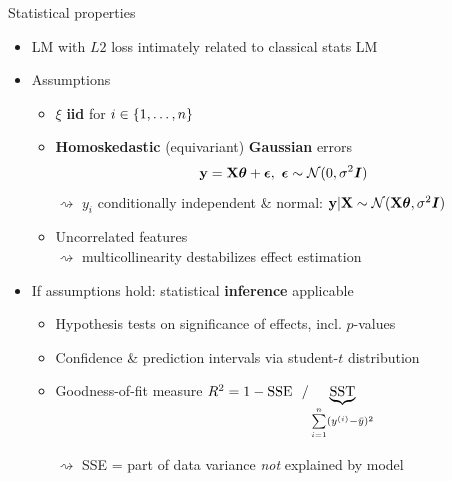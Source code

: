 \documentclass[11pt,compress,t,notes=noshow, xcolor=table]{beamer}
\begin{document}

\begin{vbframe}{Statistical properties}

\begin{itemize}
    \item LM with $L2$ loss intimately related to classical stats LM
    \item Assumptions
    \begin{itemize}
        \item $\xi$ \textbf{iid} for $i \in \{1, \ldots, n\}$
        \item \textbf{Homoskedastic} (equivariant) 
         \textbf{Gaussian} errors
        $$\mathbf{y} = \mathbf{X} \bm{\theta} + \bm{\epsilon}, ~ \bm{\epsilon} \sim 
        \mathcal{N}(0, \sigma^2 \boldsymbol{I})  $$
        $\rightsquigarrow$ $y_i$ conditionally independent \& normal:
        $\mathbf{y} | \mathbf{X} \sim \mathcal{N}(\mathbf{X} \bm{\theta}, \sigma^2 \boldsymbol{I})$
        \item Uncorrelated features \\$\rightsquigarrow$ 
        multicollinearity destabilizes effect estimation 
    \end{itemize}
    \item If assumptions hold: statistical \textbf{inference} applicable
    \begin{itemize}
            \item Hypothesis tests on significance of effects, incl. $p$-values
            \item Confidence \& prediction intervals via student-$t$ 
            distribution
        \item Goodness-of-fit measure
        $R^2 = 1 - \text{SSE} ~~ / \underbrace{\text{SST}}_{
        \sum\limits_{i=1}^n (y^{(i)} - \bar y)^2}$
        
        $\rightsquigarrow$ SSE = part of data variance \textit{not} explained 
        by model
    \end{itemize}
\end{itemize}

\end{vbframe}

\endlecture
\end{document}
